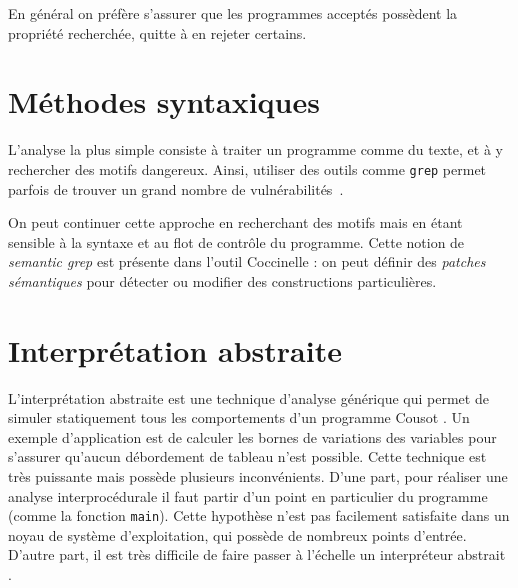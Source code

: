 En général on préfère s'assurer que les programmes acceptés possèdent la
propriété recherchée, quitte à en rejeter certains.

\section{Méthodes syntaxiques}

L'analyse la plus simple consiste à traiter un programme comme du texte, et à y
rechercher des motifs dangereux. Ainsi, utiliser des outils comme \texttt{grep}
permet parfois de trouver un grand nombre de vulnérabilités~\cite{SpenderGrep}.

On peut continuer cette approche en recherchant des motifs mais en étant
sensible à la syntaxe et au flot de contrôle du programme. Cette notion de
\emph{semantic grep} est présente dans l'outil Coccinelle
\cite{coccinelle09,coccinelle11}  : on peut définir des
\emph{patches sémantiques} pour détecter ou modifier des constructions
particulières.

\section{Interprétation abstraite}

L'interprétation abstraite est une technique d'analyse générique qui permet de
simuler statiquement tous les comportements d'un programme Cousot
\cite{Cousot77,Cousot92-1}. Un exemple d'application est de calculer les bornes
de variations des variables pour s'assurer qu'aucun débordement de tableau n'est
possible. Cette technique est très puissante mais possède plusieurs
inconvénients. D'une part, pour réaliser une analyse interprocédurale il faut
partir d'un point en particulier du programme (comme la fonction \texttt{main}).
Cette hypothèse n'est pas facilement satisfaite dans un noyau de système
d'exploitation, qui possède de nombreux points d'entrée. D'autre part,
il est très difficile de faire passer à l'échelle un interpréteur abstrait
\cite{AstreeScale,coverityBillion}.


